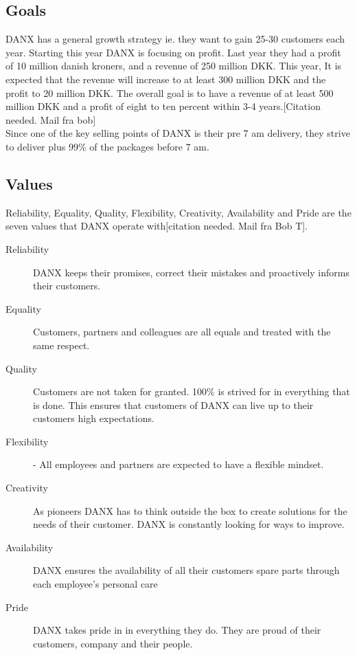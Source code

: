 \subsection{Goals}
DANX has a general growth strategy ie. they want to gain 25-30 customers each year. Starting this year DANX is focusing on profit. Last year they had a profit of 10 million danish kroners, and a revenue of 250 million DKK. This year, It is expected that the revenue will increase to at least 300 million DKK and the profit to 20 million DKK. The overall goal is to have a revenue of at least 500 million DKK and a profit of eight to ten percent within 3-4 years.[Citation needed. Mail fra bob]\\
Since one of the key selling points of DANX is their pre 7 am delivery, they strive to deliver plus 99\% of the packages before 7 am.

\subsection{Values}
Reliability, Equality, Quality, Flexibility, Creativity, Availability and Pride are the seven values that DANX operate with[citation needed. Mail fra Bob T].

\begin{description}
\item[Reliability] DANX keeps their promises, correct their mistakes and proactively informs their customers.
\item[Equality] Customers, partners and colleagues are all equals and treated with the same respect.
\item[Quality] Customers are not taken for granted. 100\% is strived for in everything that is done. This ensures that customers of DANX can live up to their customers high expectations.
\item[Flexibility] - All employees and partners are expected to have a flexible mindset.
\item[Creativity] As pioneers DANX has to think outside the box to create solutions for the needs of their customer. DANX is constantly looking for ways to improve.
\item[Availability] DANX ensures the availability of all their customers spare parts through each employee’s personal care
\item[Pride] DANX takes pride in in everything they do. They are proud of their customers, company and their people.
\end{description}

